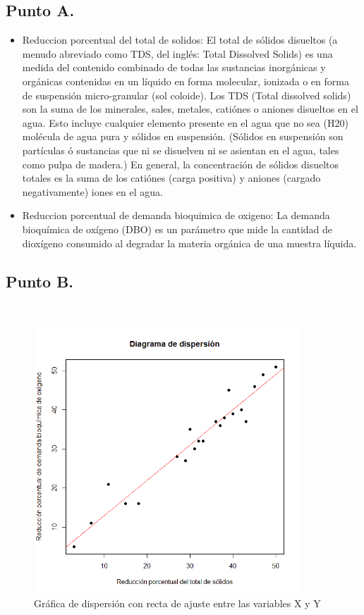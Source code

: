 \documentclass[letterpaper,12pt,onecolumn,titlepage]{article}
\begin{document}
\subsection{Punto A.}
\begin{itemize}
\item Reduccion porcentual del total de solidos: El total de s\'{o}lidos disueltos (a menudo abreviado como TDS, del ingl\'{e}s: Total Dissolved Solids) es una medida del contenido combinado de todas las sustancias inorg\'{a}nicas y org\'{a}nicas contenidas en un l\'{i}quido en forma molecular, ionizada o en forma de suspensi\'{o}n micro-granular (sol coloide). 
Los TDS (Total dissolved solids) son la suma de los minerales, sales, metales, cati\'{o}nes o aniones disueltos en el agua. Esto incluye cualquier elemento presente en el agua que no sea (H20) mol\'{e}cula de agua pura y s\'{o}lidos en suspensi\'{o}n. (S\'{o}lidos en suspensi\'{o}n son part\'{i}culas \'{o} sustancias que ni se disuelven ni se asientan en el agua, tales como pulpa de madera.)
En general, la concentraci\'{o}n de s\'{o}lidos disueltos totales es la suma de los cati\'{o}nes (carga positiva) y aniones (cargado negativamente) iones en el agua.
\item Reduccion porcentual de demanda bioquimica de oxigeno: La demanda bioqu\'{i}mica de ox\'{i}geno (DBO) es un par\'{a}metro que mide la cantidad de diox\'{i}geno consumido al degradar la materia org\'{a}nica de una muestra l\'{i}quida.
\end{itemize} 
\pagebreak\subsection{Punto B.}
~\\ \begin{figure}[!h]
    \begin{center}
        \includegraphics[width=10cm]{Figuras/punto1b.png}
        \caption{Gr\'{a}fica de dispersi\'{o}n con recta de ajuste entre las variables X y Y}
        \label{fig:Densidad}
    \end{center}
\end{figure}
\end{document}
